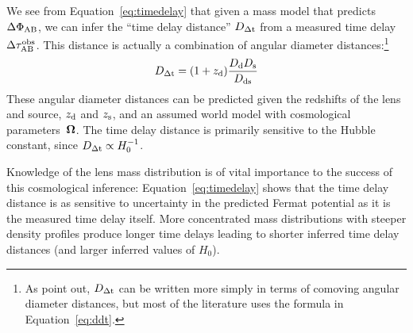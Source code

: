 
We see from Equation~\ref{eq:timedelay} that given a mass
model that predicts $\Delta \Phi_{\rm AB}$, we can infer the ``time
delay distance'' $D_{\Delta{\rm t}}$ from a measured time delay $\Delta \tau_{\rm AB}^{\rm obs}$.
This distance is actually a combination of angular diameter
distances:\footnote{As \citet{SKW06} point out, $D_{\Delta{\rm t}}$ can be written more simply in terms
of comoving angular diameter distances, but most of the literature uses the
formula in Equation~\ref{eq:ddt}.}
\begin{equation}
    D_{\Delta{\rm t}} = (1+z_{\rm d}) \frac{D_{\rm d} D_{\rm s}}{D_{\rm ds}}  \label{eq:ddt}
\end{equation}
These angular diameter distances can be predicted given the redshifts
of the lens and source, $z_{\rm d}$ and $z_{\rm s}$, and an assumed world model with
cosmological parameters~$\boldsymbol{\Omega}$. The time delay distance is primarily
sensitive to the Hubble constant, since $D_{\Delta{\rm t}} \propto H_0^{-1}$.


Knowledge of the lens mass distribution is of vital importance to the
success of this cosmological inference: Equation~\ref{eq:timedelay}
shows  that the time delay  distance is as sensitive to uncertainty in
the predicted Fermat potential as it is the measured time delay itself.
More concentrated mass distributions with steeper density
profiles produce longer time delays leading to shorter inferred time
delay distances (and larger inferred values of $H_0$).


